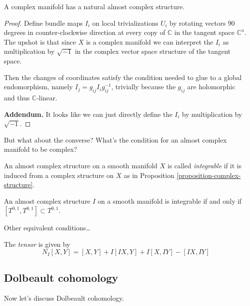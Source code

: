 \begin{proposition}
\label{proposition-complex-structure}
A complex manifold has a natural almost
complex structure.
\end{proposition}

\begin{proof}
Define bundle maps $I_i$ on local
trivializations $U_i$
by rotating vectors $90$ degrees in
counter-clockwise
direction at every copy of $\mathbb{C}$ in
the tangent space $\mathbb{C}^n$.
The upshot is that since $X$ is a complex
manifold
we can interpret the $I_i$ as multiplication
by $\sqrt{-1}$
in the complex vector space structure of the
tangent space.

Then the changes of coordinates satisfy the
condition
needed to glue to a global endomorphism,
namely
$I_j=g_{ij}I_ig_{ij}^{-1}$, trivially because
the $g_{ij}$ are holomorphic and thus
$\mathbb{C}$-linear.

\noindent
{\bf Addendum.} It looks like we can just
directly
define the $I_i$ by multiplication by
$\sqrt{-1}$.
\end{proof}


\noindent
But what about the converse?
What's the condition for an almost complex
manifold to be complex?

\begin{definition}
\label{definition-integ-almos-compl-struc}
An almost complex structure on a smooth
manifold $X$
is called {\it integrable} if it is induced
from a
complex structure on $X$ as in Proposition
\ref{proposition-complex-structure}.
\end{definition}

\begin{theorem}
\label{theorem-newlander-nirenberg}
An almost complex structure $I$
on a smooth manifold is integrable if and
only if
$[T^{0,1},T^{0,1}]\subset T^{0,1}$.
\end{theorem}

Other equivalent conditions…

The {\it tensor} is given by
$$
N_I[X,Y]=[X,Y]+I[IX,Y]+I[X,IY]-[IX,IY]
$$




\subsection{Dolbeault cohomology}
\label{subsection-dolbeault-cohomology}

\medskip\noindent
Now let's discuss Dolbeault cohomology.


